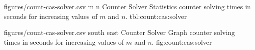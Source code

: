 \vfill

\SolverStatsTable
  {figures/count-cas-solver.csv}
  {m n}
  {\CountRowHeader}
  { Counter Solver Statistics}
  { counter solving times in seconds for increasing values of $m$ and $n$.}
  {tbl:count:cas:solver}

\SolverStatsGraph
  {figures/count-cas-solver.csv}
  {south east}
  { Counter Solver Graph}
  { counter solving times in seconds for increasing values of $m$ and $n$.}
  {fig:count:cas:solver}
